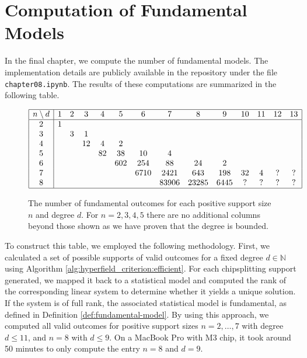 \chapter{Computation of Fundamental Models}

In the final chapter, we compute the number of fundamental models. The implementation details are publicly available in the repository \cite{ducrepo} under the file \texttt{chapter08.ipynb}. The results of these computations are summarized in the following table.

\begin{figure}[H]
    \centering
    \[
    \begin{array}{|c|ccccccccccccc|}
    \hline
    n \setminus d & 1 & 2 & 3 & 4 & 5 & 6 & 7 & 8 & 9 & 10 & 11 & 12 & 13\\
    \hline
    2 & 1 &   &   &   &   &    &    &    &    &     &  & &   \\
    3 &   & 3 & 1 &   &   &    &    &    &    &     &   & &  \\
    4 &   &   & 12 & 4 & 2 &    &    &    &    &     &  & &   \\
    5 &   &   &    & 82 & 38 & 10 & 4  &    &    &     &  &&  \\
    6 &   &   &    &    & 602 & 254 & 88 & 24 & 2  &     &  &&   \\
    7 &   &   &    &    &     & 6710 & 2421 & 643 & 198 & 32  & 4 &? & ? \\
    8 &   &   &    &    &     &  & 83906 & 23285 & 6445 & ?  & ? &?& ?\\
    \hline
    \end{array}
    \]
    \caption{The number of fundamental outcomes for each positive support size \( n \) and degree \( d \). For \( n = 2, 3, 4, 5 \) there are no additional columns beyond those shown as we have proven that the degree is bounded.}
    \label{table:computed-fundamental-models}
    \end{figure}


To construct this table, we employed the following methodology. First, we calculated a set of possible supports of valid outcomes for a fixed degree \( d\in \mathbb{N} \) using Algorithm \ref{alg:hyperfield_criterion:efficient}. For each chipsplitting support generated, we mapped it back to a statistical model and computed the rank of the corresponding linear system to determine whether it yields a unique solution. If the system is of full rank, the associated statistical model is fundamental, as defined in Definition \ref{def:fundamental-model}. By using this approach, we computed all valid outcomes for positive support sizes \( n = 2, \dots, 7 \) with degree \( d \leq 11 \), and \( n = 8 \) with \( d \leq 9 \). On a MacBook Pro with M3 chip, it took around 50 minutes to only compute the entry \( n = 8 \) and \( d = 9 \).